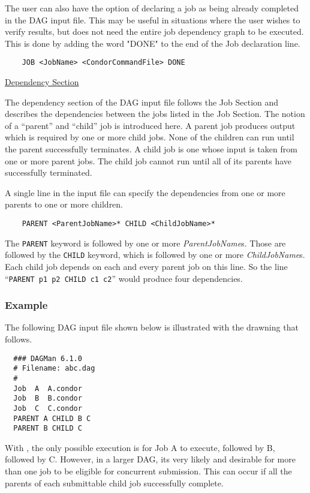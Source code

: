 The user can also have the option of declaring a job as being already
completed in the DAG input file. This may be useful in situations where the
user wishes to verify results, but does not need the entire job dependency
graph to be executed. This is done by adding the word "DONE" to the end of the
Job declaration line.

\begin{verbatim}
	JOB <JobName> <CondorCommandFile> DONE
\end{verbatim}

\underline{Dependency Section}

The dependency section of the DAG input file follows the Job Section and
describes the dependencies between the jobs listed in the Job Section.  The
notion of a ``parent'' and ``child'' job is introduced here.  A parent job
produces output which is required by one or more child jobs.  None of the
children can run until the parent successfully terminates.  A child job is one
whose input is taken from one or more parent jobs.  The child job cannot run
until all of its parents have successfully terminated.

A single line in the input file can specify the dependencies from one or more
parents to one or more children.

\begin{verbatim}
	PARENT <ParentJobName>* CHILD <ChildJobName>*
\end{verbatim}

The \texttt{PARENT} keyword is followed by one or more
\textit{ParentJobName}s.  Those are followed by the \texttt{CHILD} keyword,
which is followed by one or more \textit{ChildJobName}s.  Each child job
depends on each and every parent job on this line.  So the line
``\texttt{PARENT p1 p2 CHILD c1 c2}'' would produce four dependencies.

\subsubsection{Example}

The following  DAG input file shown below is illustrated with
the drawning that follows.

\begin{verbatim}
  ### DAGMan 6.1.0
  # Filename: abc.dag
  #
  Job  A  A.condor 
  Job  B  B.condor 
  Job  C  C.condor	
  PARENT A CHILD B C
  PARENT B CHILD C
\end{verbatim}

With , the only possible execution is for Job A to execute,
followed by B, followed by C.  However, in a larger DAG, its very likely and
desirable for more than one job to be eligible for concurrent submission.
This can occur if all the parents of each submittable child job successfully
complete.

